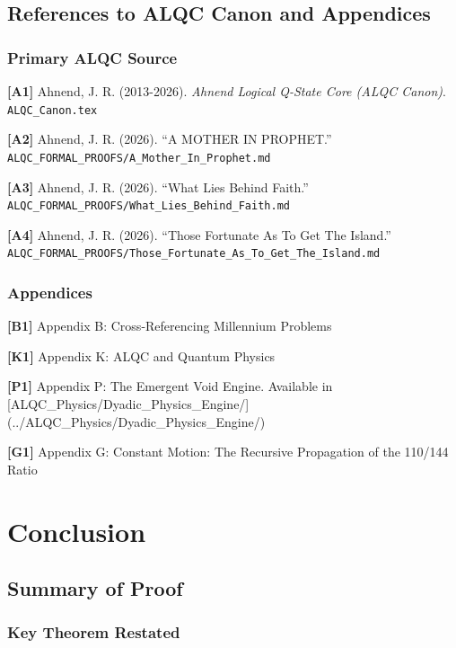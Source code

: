 \documentclass[11pt, letterpaper]{article}
\begin{document}
\subsection{References to ALQC Canon and Appendices}

\subsubsection{Primary ALQC Source}

\textbf{[A1]} Ahnend, J. R. (2013-2026). \emph{Ahnend Logical Q-State Core (ALQC Canon)}. \texttt{ALQC\_Canon.tex}

\textbf{[A2]} Ahnend, J. R. (2026). ``A MOTHER IN PROPHET.'' \texttt{ALQC\_FORMAL\_PROOFS/A\_Mother\_In\_Prophet.md}

\textbf{[A3]} Ahnend, J. R. (2026). ``What Lies Behind Faith.'' \texttt{ALQC\_FORMAL\_PROOFS/What\_Lies\_Behind\_Faith.md}

\textbf{[A4]} Ahnend, J. R. (2026). ``Those Fortunate As To Get The Island.'' \texttt{ALQC\_FORMAL\_PROOFS/Those\_Fortunate\_As\_To\_Get\_The\_Island.md}

\subsubsection{Appendices}

\textbf{[B1]} Appendix B: Cross-Referencing Millennium Problems

\textbf{[K1]} Appendix K: ALQC and Quantum Physics

\textbf{[P1]} Appendix P: The Emergent Void Engine. Available in [ALQC\_Physics/Dyadic\_Physics\_Engine/](../ALQC\_Physics/Dyadic\_Physics\_Engine/)

\textbf{[G1]} Appendix G: Constant Motion: The Recursive Propagation of the 110/144 Ratio

\section{Conclusion}

\subsection{Summary of Proof}

\subsubsection{Key Theorem Restated}
\end{document}
